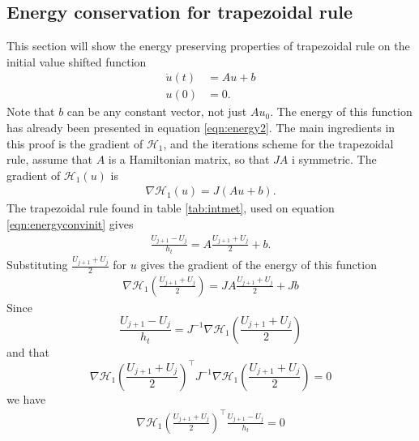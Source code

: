 \subsection{Energy conservation for trapezoidal rule} %
This section will show the energy preserving properties of trapezoidal rule on the initial value shifted function
\begin{equation}
\begin{aligned}
\dot{u}(t)& = Au + b \\
u(0)& = 0.
\end{aligned}
\label{eqn:energyconvinit}
\end{equation}
Note that $b$ can be any constant vector, not just $A u_0$.
The energy of this function has already been presented in equation \eqref{eqn:energy2}. The main ingredients in this proof is the gradient of $\mathcal{H}_1$, and the iterations scheme for the trapezoidal rule, assume that $A$ is a Hamiltonian matrix, so that $JA$ i symmetric. The gradient of $\mathcal{H}_1(u)$ is 
\begin{equation}
\begin{aligned}
\nabla \mathcal{H}_1(u) = J (Au + b) .
\end{aligned}
\end{equation}
The trapezoidal rule found in table \ref{tab:intmet}, used on equation \eqref{eqn:energyconvinit} gives 
\begin{equation}
\begin{aligned}
\frac{U_{j+1} - U_j}{h_t} = A \frac{U_{j+1}  + U_j}{2} + b.
\end{aligned}
\end{equation}
Substituting $\frac{U_{j+1}  + U_j}{2} $ for $u$ gives the gradient of the energy of this function
\begin{equation}
\begin{aligned}
\nabla \mathcal{H}_1(\frac{U_{j+1}  + U_j}{2}) = JA \frac{U_{j+1}  + U_j}{2} + J b
\end{aligned}
\end{equation}
Since
\begin{equation}
\frac{ U_{j+1} - U_j}{h_t} = J^{-1} \nabla \mathcal{H}_1( \frac{U_{j+1}  + U_j}{2} ) 
\end{equation} 
and that
\begin{equation}
\nabla \mathcal{H}_1(\frac{U_{j+1}  + U_j}{2})^\top J^{-1} \nabla \mathcal{H}_1(\frac{U_{j+1}  + U_j}{2}) = 0
\end{equation}
we have
\begin{equation}
\begin{aligned}
\nabla \mathcal{H}_1 (\frac{U_{j+1}  + U_j}{2}) ^\top \frac{U_{j+1} - U_j}{ h_t } = 0
\end{aligned}
\end{equation}
